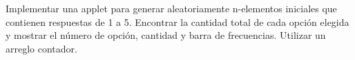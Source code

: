 Implementar una applet  para generar aleatoriamente n-elementos iniciales que contienen respuestas de 1 a 5. Encontrar la cantidad total de cada opción elegida y mostrar el número de opción, cantidad y barra de frecuencias. Utilizar un arreglo contador.